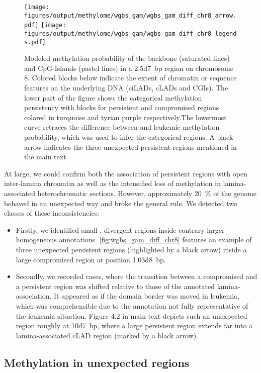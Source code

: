 \begin{figure}[!ht]
	\centering
	\texttt{[image: figures/output/methylome/wgbs\_gam/wgbs\_gam\_diff\_chr8\_arrow.pdf]}
	\texttt{[image: figures/output/methylome/wgbs\_gam/wgbs\_gam\_diff\_chr8\_legends.pdf]} 
	\caption{Modeled methylation probability of the backbone (saturated lines) and CpG-Islands (pastel lines) in a \SI{2.5d7}{bp} region on chromosome \num{8}. Colored blocks below indicate the extent of chromatin or sequence features on the underlying DNA (ciLADs, cLADs and CGIs). The lower part of the figure shows the categorical methylation persistency with blocks for persistent and compromised regions colored in turquoise and tyrian purple respectively.The lowermost curve retraces the difference between \dnmtchip and \dnmtwt \kitpos leukemic methylation probability, which was used to infer the categorical regions. A black arrow indicates the three unexpected persistent regions mentioned in the main text.}
	\label{fig:wgbs_gam_diff_chr8}
\end{figure}

At large, we could confirm both the association of persistent regions with open inter-lamina chromatin as well as the intensified loss of methylation in lamina-associated heterochromatic sections. However, approximately \SI{20}{\percent} of the genome behaved in an unexpected way and broke the general rule. We detected two classes of these inconsistencies:

\begin{itemize}
	\item Firstly, we identified small , divergent regions inside contrary larger homogeneous annotations. \autoref{fig:wgbs_gam_diff_chr8} features an example of three unexpected persistent regions (highlighted by a black arrow) inside a large compromised region at position \SI{1.03d8}{bp}.
	\item Secondly, we recorded cases, where the transition between a compromised and a persistent region was shifted relative to those of the annotated lamina-association. It appeared as if the domain border was moved in leukemia, which was comprehensible due to the annotation not fully representative of the leukemia situation. {\color{fbbioblue} Figure 4.2 in main text} depicts such an unexpected region roughly at \SI{10d7}{bp}, where a large persistent region extends far into a lamina-associated cLAD region (marked by a black arrow). 
\end{itemize} 

\subsection{Methylation in unexpected regions}
\label{chap:r:gam:chromatin:unexpected}

